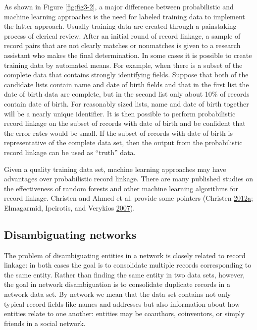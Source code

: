 \documentclass[]{krantz}
\begin{document}
As shown in Figure \ref{fig:fig3-2}, a major difference between
probabilistic and machine learning approaches is the need for labeled
training data to implement the latter approach. Usually training data
are created through a painstaking process of clerical review. After an
initial round of record linkage, a sample of record pairs that are not
clearly matches or nonmatches is given to a research assistant who makes
the final determination. In some cases it is possible to create training
data by automated means. For example, when there is a subset of the
complete data that contains strongly identifying fields. Suppose that
both of the candidate lists contain name and date of birth fields and
that in the first list the date of birth data are complete, but in the
second list only about 10\% of records contain date of birth. For
reasonably sized lists, name and date of birth together will be a nearly
unique identifier. It is then possible to perform probabilistic record
linkage on the subset of records with date of birth and be confident
that the error rates would be small. If the subset of records with date
of birth is representative of the complete data set, then the output
from the probabilistic record linkage can be used as ``truth'' data.

Given a quality training data set, machine learning approaches may have
advantages over probabilistic record linkage. There are many published
studies on the effectiveness of random forests and other machine
learning algorithms for record linkage. Christen and Ahmed et al.
provide some pointers (Christen
\protect\hyperlink{ref-christen2012survey}{2012}\protect\hyperlink{ref-christen2012survey}{a};
Elmagarmid, Ipeirotis, and Verykios
\protect\hyperlink{ref-elmagarmid2007duplicate}{2007}).

\subsection{Disambiguating networks}\label{disambiguating-networks}

The problem of disambiguating entities in a network is closely related
to record linkage: in both cases the goal is to consolidate multiple
records corresponding to the same entity. Rather than finding the same
entity in two data sets, however, the goal in network disambiguation is
to consolidate duplicate records in a network data set. By network we
mean that the data set contains not only typical record fields like
names and addresses but also information about how entities relate to
one another: entities may be coauthors, coinventors, or simply friends
in a social network.
\end{document}
